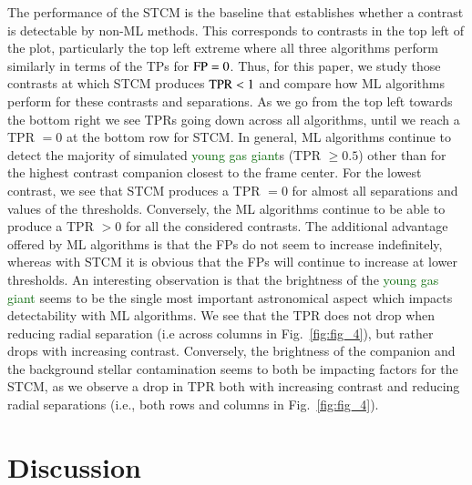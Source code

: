 \documentclass[referee]{aa} %
\newcommand{\newchange}[1]{\textcolor{darkgreen}{#1}}
\begin{document}
The performance of the STCM is the baseline that establishes whether a contrast is detectable by non-ML methods. 
This corresponds to contrasts in the top left of the plot, particularly the top left extreme where all three algorithms perform similarly in terms of the TPs for ${\rm FP}=0$.
Thus, for this paper, we study those contrasts at which STCM produces ${\rm TPR}<1$ and compare how ML algorithms perform for these contrasts and separations.
As we go from the top left towards the bottom right we see TPRs going down across all algorithms, until we reach a TPR $=0$ at the bottom row for STCM. 
In general, ML algorithms continue to detect the majority of simulated \newchange{young gas giant}s (TPR $\ge 0.5$) other than for the highest contrast companion closest to the frame center.
For the lowest contrast, we see that STCM produces a TPR $=0$ for almost all separations and values of the thresholds.
Conversely, the ML algorithms continue to be able to produce a TPR $>0$ for all the considered contrasts.
The additional advantage offered by ML algorithms is that the FPs do not seem to increase indefinitely, whereas with STCM it is obvious that the FPs will continue to increase at lower thresholds.
An interesting observation is that the brightness of the \newchange{young gas giant} seems to be the single most important astronomical aspect which impacts detectability with ML algorithms.
We see that the TPR does not drop when reducing radial separation (i.e across columns in Fig.~\ref{fig:fig_4}), but rather drops with increasing contrast. 
Conversely,  the brightness of the companion and the background stellar contamination seems to both be impacting factors for the STCM, as we observe a drop in TPR both with increasing contrast and reducing radial separations (i.e., both rows and columns in Fig.~\ref{fig:fig_4}).



\section{Discussion}
\label{sec:discussion}
\end{document}

